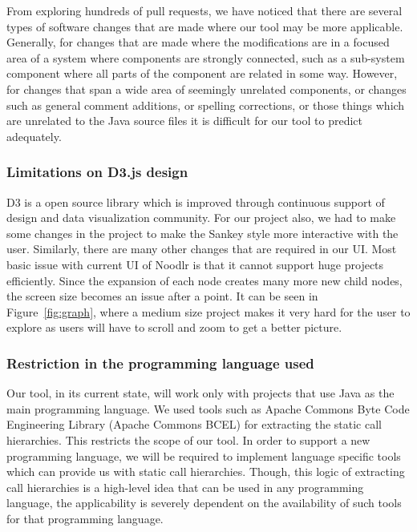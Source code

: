 From exploring hundreds of pull requests, we have noticed that there are several types of software changes that are made where our tool may be more applicable. Generally, for changes that are made where the modifications are in a focused area of a system where components are strongly connected, such as a sub-system component where all parts of the component are related in some way. However, for changes that span a wide area of seemingly unrelated components, or changes such as general comment additions, or spelling corrections, or those things which are unrelated to the Java source files it is difficult for our tool to predict adequately.


\subsubsection{Limitations on D3.js design}

D3 is a open source library which is improved through continuous support of design and data visualization community. For our project also, we had to make some changes in the project to make the Sankey style more interactive with the user. Similarly, there are many other changes that are required in our UI. Most basic issue with current UI of Noodlr is that it cannot support huge projects efficiently. Since the expansion of each node creates many more new child nodes, the screen size becomes an issue after a point. It can be seen in Figure~\ref{fig:graph}, where a medium size project makes it very hard for the user to explore as users will have to scroll and zoom to get a better picture.

\subsubsection{Restriction in the programming language used}

Our tool, in its current state, will work only with projects that use Java as the main programming language. We used tools such as Apache Commons Byte Code Engineering Library (Apache Commons BCEL\texttrademark) for extracting the static call hierarchies. This restricts the scope of our tool. In order to support a new programming language, we will be required to implement language specific tools which can provide us with static call hierarchies. Though, this logic of extracting call hierarchies is a high-level idea that can be used in any programming language, the applicability is severely dependent on the availability of such tools for that programming language. 
